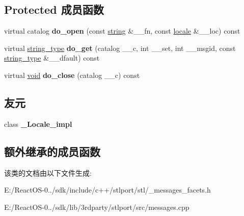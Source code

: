 \subsection*{Protected 成员函数}
\begin{DoxyCompactItemize}
\item 
\mbox{\label{classmessages__byname_3_01char_01_4_aa6c88e61efa3e1e5b48497bf71376f78}} 
virtual catalog {\bfseries do\+\_\+open} (const \hyperlink{structstring}{string} \&\+\_\+\+\_\+fn, const \hyperlink{classlocale}{locale} \&\+\_\+\+\_\+loc) const
\item 
\mbox{\label{classmessages__byname_3_01char_01_4_a645d4dfe064571611c62e4bef5d137e4}} 
virtual \hyperlink{structstring}{string\+\_\+type} {\bfseries do\+\_\+get} (catalog \+\_\+\+\_\+c, int \+\_\+\+\_\+set, int \+\_\+\+\_\+msgid, const \hyperlink{structstring}{string\+\_\+type} \&\+\_\+\+\_\+dfault) const
\item 
\mbox{\label{classmessages__byname_3_01char_01_4_a273f409da991cab10ef10aaf081eb1de}} 
virtual \hyperlink{interfacevoid}{void} {\bfseries do\+\_\+close} (catalog \+\_\+\+\_\+c) const
\end{DoxyCompactItemize}
\subsection*{友元}
\begin{DoxyCompactItemize}
\item 
\mbox{\label{classmessages__byname_3_01char_01_4_ae9c09ac7cd16ad35f8fdb1587ac77eb8}} 
class {\bfseries \+\_\+\+Locale\+\_\+impl}
\end{DoxyCompactItemize}
\subsection*{额外继承的成员函数}


该类的文档由以下文件生成\+:\begin{DoxyCompactItemize}
\item 
E\+:/\+React\+O\+S-\/0../sdk/include/c++/stlport/stl/\+\_\+messages\+\_\+facets.\+h\item 
E\+:/\+React\+O\+S-\/0../sdk/lib/3rdparty/stlport/src/messages.\+cpp\end{DoxyCompactItemize}
